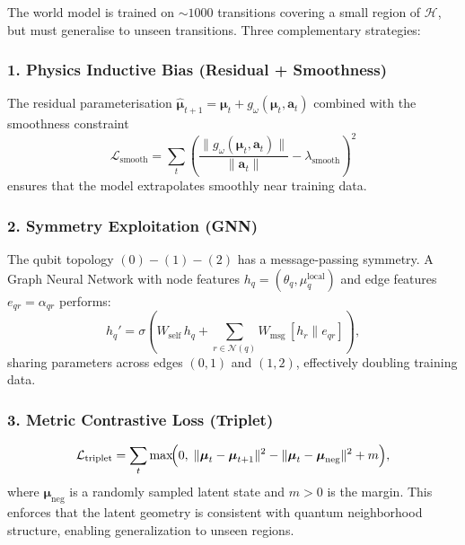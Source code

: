 \documentclass[11pt,a4paper]{article}
\begin{document}
The world model is trained on $\sim\!1000$ transitions covering a small region of
$\mathcal{H}$, but must generalise to unseen transitions. Three complementary strategies:

\subsubsection{1. Physics Inductive Bias (Residual + Smoothness)}

The residual parameterisation $\hat{\boldsymbol{\mu}}_{t+1} = \boldsymbol{\mu}_t + g_\omega(\boldsymbol{\mu}_t, \mathbf{a}_t)$
combined with the smoothness constraint
\begin{equation}
    \mathcal{L}_{\mathrm{smooth}} = \sum_{t}
    \left(\frac{\|g_\omega(\boldsymbol{\mu}_t, \mathbf{a}_t)\|}{\|\mathbf{a}_t\|} - \lambda_{\mathrm{smooth}}\right)^2
\end{equation}
ensures that the model extrapolates smoothly near training data.

\subsubsection{2. Symmetry Exploitation (GNN)}

The qubit topology $(0)-(1)-(2)$ has a message-passing symmetry. A Graph Neural Network
with node features $h_q = (\theta_q, \mu_q^{\mathrm{local}})$ and edge features
$e_{qr} = \alpha_{qr}$ performs:
\begin{equation}
    h_q' = \sigma\!\left(W_{\mathrm{self}}\, h_q
    + \sum_{r \in \mathcal{N}(q)} W_{\mathrm{msg}}\, [h_r \| e_{qr}]\right),
\end{equation}
sharing parameters across edges $(0,1)$ and $(1,2)$, effectively doubling training data.

\subsubsection{3. Metric Contrastive Loss (Triplet)}

\begin{equation}
    \mathcal{L}_{\mathrm{triplet}} = \sum_t
    \max\!\Bigl(0,\;
    \|\boldsymbol{\mu}_t - \boldsymbol{\mu}_{t+1}\|^2
    - \|\boldsymbol{\mu}_t - \boldsymbol{\mu}_{\mathrm{neg}}\|^2
    + m\Bigr),
\end{equation}
where $\boldsymbol{\mu}_{\mathrm{neg}}$ is a randomly sampled latent state and $m > 0$
is the margin. This enforces that the latent geometry is consistent with quantum
neighborhood structure, enabling generalization to unseen regions.
\end{document}
